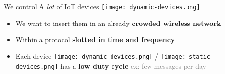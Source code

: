 \begin{frameO}[We want]

    We control A \emph{lot} of IoT devices \texttt{[image: dynamic-devices.png]}

    \begin{itemize}
        \item
            We want to insert them in an already \textbf{crowded wireless network}
        \item
            Within a protocol \textbf{slotted in time and frequency}
        \item
            Each device \texttt{[image: dynamic-devices.png]} / \texttt{[image: static-devices.png]} has a \textbf{low duty cycle} \hfill{}
            \textcolor{gray}{ex: few messages per day}
    \end{itemize}

    \pause






\end{frameO}



